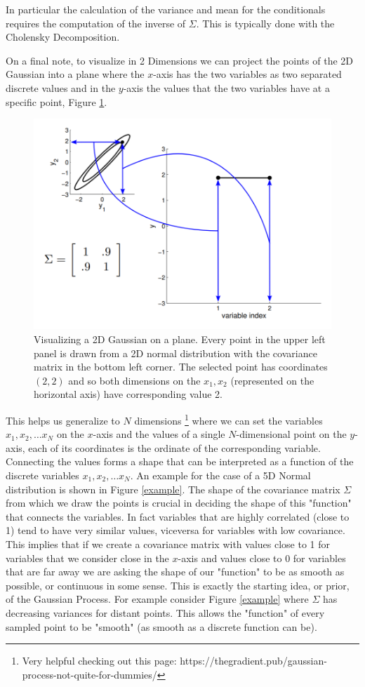 \documentclass{article}
\begin{document}
In particular the calculation of the variance and mean for the conditionals requires the computation of the inverse of $\Sigma$. This is typically done with the Cholensky Decomposition. 

On a final note, to visualize in 2 Dimensions we can project the points of the 2D Gaussian into a plane where the $x$-axis has the two variables as two separated discrete values and in the $y$-axis the values that the two variables have at a specific point, Figure \ref{visual}. 
\begin{figure}
    \centering
    \includegraphics[width = .8\linewidth]{visualize1.png}
    \caption{Visualizing a 2D Gaussian on a plane. Every point in the upper left panel is drawn from a 2D normal distribution with the covariance matrix in the bottom left corner. The selected point has coordinates $(2,2)$ and so both dimensions on the $x_1, x_2$ (represented on the horizontal axis) have corresponding value 2.}
    \label{visual}
\end{figure}

This helps us generalize to $N$ dimensions \footnote{Very helpful checking out this page: https://thegradient.pub/gaussian-process-not-quite-for-dummies/} where we can set the variables $x_1, x_2, \dots x_N$ on the $x$-axis and the values of a single $N$-dimensional point on the $y$-axis, each of its coordinates is the ordinate of the corresponding variable. Connecting the values forms a shape that can be interpreted as a function of the discrete variables $x_1, x_2, \dots x_N$. An example for the case of a 5D Normal distribution is shown in Figure \ref{example}. The shape of the covariance matrix $\Sigma$ from which we draw the points is crucial in deciding the shape of this "function" that connects the variables. In fact variables that are highly correlated (close to 1) tend to have very similar values, viceversa for variables with low covariance. This implies that if we create a covariance matrix with values close to 1 for variables that we consider close in the $x$-axis and values close to 0 for variables that are far away we are asking the shape of our "function" to be as smooth as possible, or continuous in some sense. This is exactly the starting idea, or prior, of the Gaussian Process. For example consider Figure \ref{example} where $\Sigma$ has decreasing variances for distant points. This allows the "function" of every sampled point to be "smooth" (as smooth as a discrete function can be).
\end{document}
